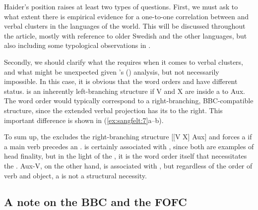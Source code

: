 \documentclass[output=paper, colorlinks, citecolor=brown]{langscibook}
\begin{document}
\ea
\label{ex:sangfelt:6}
 \label{ex:sangfelt:6a}
 \label{ex:sangfelt:6b}
\z
\z 


 Haider’s position raises at least two types of questions. First, we must ask to what extent there is empirical evidence for a one-to-one correlation between  and verbal clusters in the languages of the world. This  will be discussed throughout the article, mostly with reference to older Swedish and the other  languages, but also including some typological observations in .

Secondly, we should clarify what the  requires when it comes to verbal clusters, and what might be unexpected given \citeauthor{Haider2010}’s (\citeyear{Haider2010, Haider2013}) analysis, but not necessarily impossible. In this case, it is obvious that the word orders  and  have different status.  is an inherently left-branching structure if V and X are inside a  to Aux. The word order  would typically correspond to a right-branching, BBC-compatible structure, since the extended verbal projection has its  to the right. This important difference is shown in (\ref{ex:sangfelt:7}a–b).


\ea
\label{ex:sangfelt:7}
\ex{[\textsubscript{VP1} Aux [\textsubscript{VP2} X V]\label{ex:sangfelt:7b}}
\z 
\z 

To sum up, the  excludes the right-branching structure [[V X] Aux] and forces a  if a main verb precedes an .  is certainly associated with , since both are examples of head finality, but in the light of the , it is the  word order itself that necessitates the . Aux-V, on the other hand, is associated with , but regardless of the order of verb and object, a  is not a structural necessity.

\subsection{A note on the BBC and the FOFC}\label{sec:sangfelt:2.2}
\end{document}
